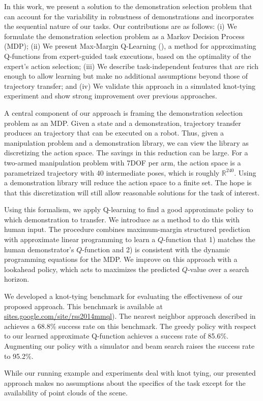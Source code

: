 \documentclass[conference]{IEEEtran}
\begin{document}
In this work, we present a solution to the demonstration selection
problem that can account for the variability in robustness of
demonstrations and incorporates the sequential nature of our
tasks. Our contributions are as follows: (i) We formulate the
demonstration selection problem as a Markov Decision Process (MDP);
(ii) We present Max-Margin Q-Learning (\mmql{}), a method for
approximating Q-functions from expert-guided task executions, based on
the optimality of the expert's action selection; (iii) We describe
task-independent features that are rich enough to allow learning but
make no additional assumptions beyond those of trajectory transfer;
and (iv) We validate this approach in a simulated knot-tying
experiment and show strong improvement over previous approaches. 

A central component of our approach is framing the demonstration
selection problem as an MDP. Given a state and a demonstration,
trajectory transfer produces an trajectory that can be executed on a
robot. Thus, given a manipulation problem and a demonstration library,
we can view the library as discretizing the action space. The savings
in this reduction can be large. For a two-armed manipulation problem
with 7DOF per arm, the action space is a parametrized trajectory with
40 intermediate poses, which is roughly $\mathbb{R}^{240}$. Using a
demonstration library will reduce the action space to a finite
set. The hope is that this discretization will still allow reasonable
solutions for the task of interest.

Using this formalism, we apply Q-learning to find a good approximate
policy to which demonstration to transfer. We introduce \mmql{} as a
method to do this with human input. The procedure combines
maximum-margin structured prediction with approximate linear
programming to learn a $Q$-function that 1) matches the human
demonstrator's $Q$-function and 2) is consistent with the dynamic
programming equations for the MDP. We improve on this approach with a
lookahead policy, which acts to maximizes the predicted $Q$-value over
a search horizon.

We developed a knot-tying benchmark for evaluating the effectiveness of
our proposed approach.   This benchmark is available at
\href{https://sites.google.com/site/rss2014mmql}{sites.google.com/site/rss2014mmql}). The
nearest neighbor approach described in \citet{Schulmanetal_ISRR2013} achieves a
68.8\% success rate on this benchmark.  The greedy policy with respect to our learned
approximate Q-function achieves a success rate of 85.6\%. Augmenting our
policy with a simulator and beam search raises the success rate to 95.2\%.

While our running example and experiments deal with knot tying, our presented
\mmql{} approach makes no assumptions about the
specifics of the task except for the availability of point clouds of
the scene.


\maketitle




\end{document}
